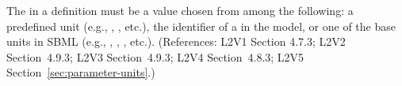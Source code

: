 The  in a \Parameter definition must be a value chosen from
among the following: a predefined unit (e.g., , ,
etc.), the identifier of a \UnitDefinition in the model, or one of the
base units in SBML (e.g., , , ,
etc.).  (References: L2V1 Section 4.7.3; L2V2 Section~4.9.3; L2V3
Section~4.9.3; L2V4 Section~4.8.3; L2V5 Section~\ref{sec:parameter-units}.)
